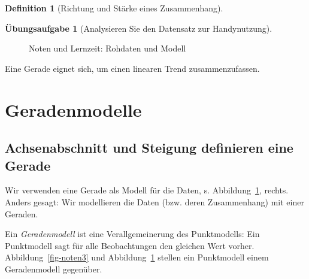 \documentclass[
  a4paper,
  DIV=11]{scrreprt}
\theoremstyle{definition}
\newtheorem{exercise}{Übungsaufgabe}[chapter]
\theoremstyle{definition}
\theoremstyle{definition}
\newtheorem{definition}{Definition}[chapter]
\theoremstyle{remark}
\begin{document}
\begin{definition}[Richtung und Stärke eines
Zusammenhang]
\begin{exercise}[Analysieren Sie den Datensatz zur
Handynutzung]
\begin{figure}
\begin{minipage}{0.50\linewidth}


\end{minipage}%

\caption{\label{fig-noten4}Noten und Lernzeit: Rohdaten und Modell}

\end{figure}%

Eine Gerade eignet sich, um einen linearen Trend zusammenzufassen.

\section{Geradenmodelle}\label{geradenmodelle}

\subsection{Achsenabschnitt und Steigung definieren eine
Gerade}\label{achsenabschnitt-und-steigung-definieren-eine-gerade}

Wir verwenden eine Gerade als Modell für die Daten, s.
Abbildung~\ref{fig-noten4}, rechts. Anders gesagt: Wir modellieren die
Daten (bzw. deren Zusammenhang) mit einer Geraden.

Ein \emph{Geradenmodell} ist eine Verallgemeinerung des Punktmodells:
Ein Punktmodell sagt für alle Beobachtungen den gleichen Wert vorher.
Abbildung~\ref{fig-noten3} und Abbildung~\ref{fig-noten4} stellen ein
Punktmodell einem Geradenmodell gegenüber.


\end{exercise}
\end{definition}
\end{document}
